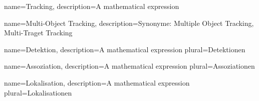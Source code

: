 {
        name=Tracking,
        description={A mathematical expression}
}

{
        name=Multi-Object Tracking,
        description={Synonyme: Multiple Object Tracking, Multi-Traget Tracking}
}

{
        name=Detektion,
        description={A mathematical expression}
        plural=Detektionen
}

{
        name=Assoziation,
        description={A mathematical expression}
        plural=Assoziationen
}

{
        name=Lokalisation,
        description={A mathematical expression}
        plural=Lokalisationen
}


